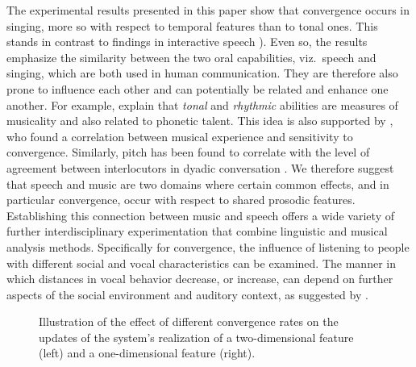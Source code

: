 The experimental results presented in this paper show that convergence occurs in singing, more so with respect to temporal features than to tonal ones.
This stands in contrast to findings in interactive speech \citep[e.g.,][]{Raveh2019InterspeechAlexa}).
Even so, the results emphasize the similarity between the two oral capabilities, viz.\ speech and singing, which are both used in human communication.
They are therefore also prone to influence each other and can potentially be related and enhance one another.
For example, \citet[][p. 216]{Nardo2009musicality} explain that \emph{tonal} and \emph{rhythmic} abilities are measures of musicality and also related to phonetic talent.
This idea is also supported by \citet{Tsang2018musical}, who found a correlation between musical experience and sensitivity to convergence.
Similarly, pitch has been found to correlate with the level of agreement between interlocutors in dyadic conversation \citep{Okada2012interpreting}.
We therefore suggest that speech and music are two domains where certain common effects, and in particular convergence, occur with respect to shared prosodic features.
Establishing this connection between music and speech offers a wide variety of further interdisciplinary experimentation that combine linguistic and musical analysis methods.
Specifically for convergence, the influence of listening to people with different social and vocal characteristics can be examined.
The manner in which distances in vocal behavior decrease, or increase, can depend on further aspects of the social environment and auditory context, as suggested by \citet{Noy1999psychoanalysis}.

\begin{figure}[t]
	\centering
	\hfill
	\caption[Influence of difference convergence rates on the system's accommodation]
		{Illustration of the effect of different convergence rates on the updates of the system's  realization of a two-dimensional feature (left) and a one-dimensional feature (right).}
	\label{fig:deviation_examples}
\end{figure}


